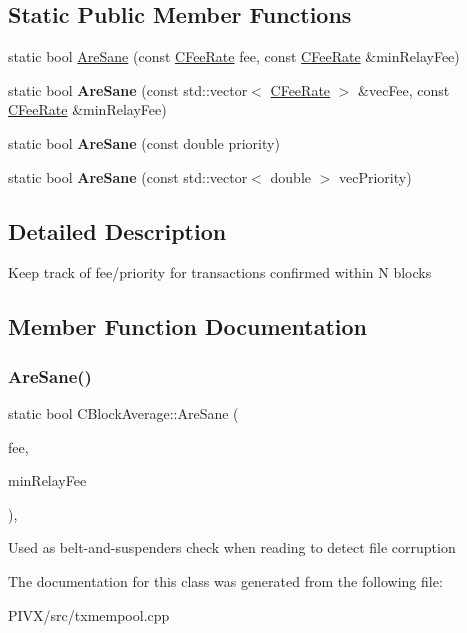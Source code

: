 \subsection*{Static Public Member Functions}
\begin{DoxyCompactItemize}
\item 
static bool \mbox{\hyperlink{class_c_block_average_a31ed22222a49a95787f9791f212ec521}{Are\+Sane}} (const \mbox{\hyperlink{class_c_fee_rate}{C\+Fee\+Rate}} fee, const \mbox{\hyperlink{class_c_fee_rate}{C\+Fee\+Rate}} \&min\+Relay\+Fee)
\item 
\mbox{\label{class_c_block_average_a92abf5615a926971eba5f6fbaadac880}} 
static bool {\bfseries Are\+Sane} (const std\+::vector$<$ \mbox{\hyperlink{class_c_fee_rate}{C\+Fee\+Rate}} $>$ \&vec\+Fee, const \mbox{\hyperlink{class_c_fee_rate}{C\+Fee\+Rate}} \&min\+Relay\+Fee)
\item 
\mbox{\label{class_c_block_average_af5b855fc318c24c1eda1998ae07a8ed2}} 
static bool {\bfseries Are\+Sane} (const double priority)
\item 
\mbox{\label{class_c_block_average_a2bdd0f3aa2eb5edddde259551965fcaf}} 
static bool {\bfseries Are\+Sane} (const std\+::vector$<$ double $>$ vec\+Priority)
\end{DoxyCompactItemize}


\subsection{Detailed Description}
Keep track of fee/priority for transactions confirmed within N blocks 

\subsection{Member Function Documentation}
\mbox{\label{class_c_block_average_a31ed22222a49a95787f9791f212ec521}} 
\subsubsection{\texorpdfstring{Are\+Sane()}{AreSane()}}
{\footnotesize\ttfamily static bool C\+Block\+Average\+::\+Are\+Sane (\begin{DoxyParamCaption}\item[{const \mbox{\hyperlink{class_c_fee_rate}{C\+Fee\+Rate}}}]{fee,  }\item[{const \mbox{\hyperlink{class_c_fee_rate}{C\+Fee\+Rate}} \&}]{min\+Relay\+Fee }\end{DoxyParamCaption})\hspace{0.3cm}{\ttfamily [inline]}, {\ttfamily [static]}}

Used as belt-\/and-\/suspenders check when reading to detect file corruption 

The documentation for this class was generated from the following file\+:\begin{DoxyCompactItemize}
\item 
P\+I\+V\+X/src/txmempool.\+cpp\end{DoxyCompactItemize}

